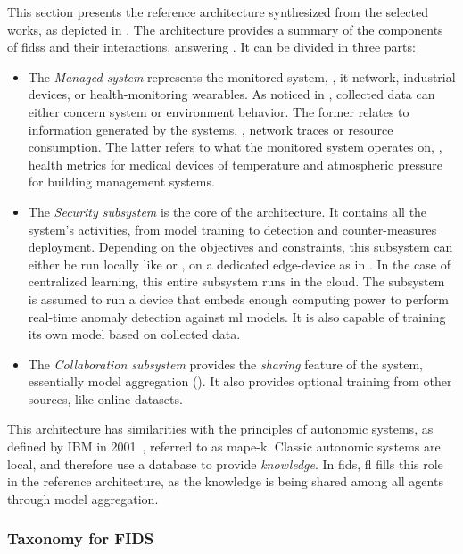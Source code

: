 This section presents the reference architecture synthesized from the selected works, as depicted in .
The architecture provides a summary of the components of \glspl{fids} and their interactions, answering .
It can be divided in three parts:
\begin{itemize}
  \item The \emph{Managed system} represents the monitored system, \eg, \gls{it} network, industrial devices, or health-monitoring wearables.
  As noticed in , collected data can either concern system or environment behavior.
  The former relates to information generated by the systems, \eg, network traces or resource consumption.
  The latter refers to what the monitored system operates on, \eg, health metrics for medical devices of temperature and atmospheric pressure for building management systems.
  
  \item The \emph{Security subsystem} is the core of the architecture.
  It contains all the system's activities, from model training to detection and counter-measures deployment.
  Depending on the objectives and constraints, this subsystem can either be run locally like \cite{pahl_AllEyesYou_2018} or \cite{hei_trustedfeatureaggregator_2020}, on a dedicated edge-device as in \cite{li_DeepFedFederatedDeep_2020}.
  In the case of centralized learning, this entire subsystem runs in the cloud.
  The subsystem is assumed to run a device that embeds enough computing power to perform real-time anomaly detection against \gls{ml} models.
  It is also capable of training its own model based on collected data.

  \item The \emph{Collaboration subsystem} provides the \emph{sharing} feature of the system, essentially model aggregation ().
  It also provides optional training from other sources, like online datasets.
\end{itemize}

This architecture has similarities with the principles of autonomic systems, as defined by IBM in 2001~\cite{kephart_visionautonomiccomputing_2003}, referred to as \gls{mape-k}.
Classic autonomic systems are local, and therefore use a database to provide \emph{knowledge}.
In \gls{fids}, \gls{fl} fills this role in the reference architecture, as the knowledge is being shared among all agents through model aggregation.


\subsubsection{Taxonomy for FIDS\label{sec:sota.discuss.synthesis.taxo}}

